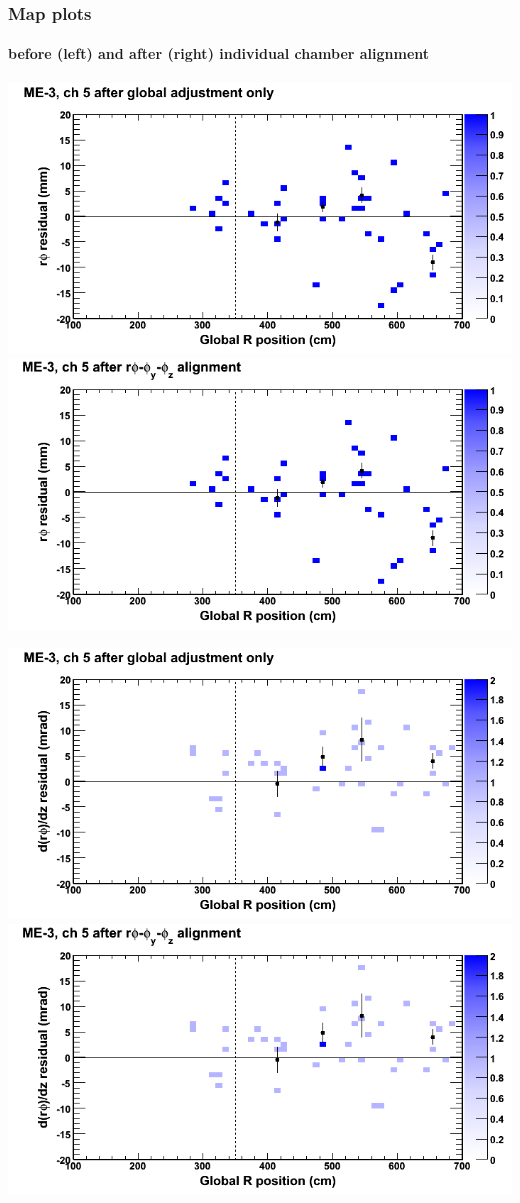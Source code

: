 \documentclass[compress]{beamer}
\begin{document}
\begin{frame}
\frametitle{Map plots}
\framesubtitle{before (left) and after (right) individual chamber alignment}
\includegraphics[width=0.5\linewidth]{ringmapplots_3dof/before_CSCvsr_mem3ch05_x.png} \includegraphics[width=0.5\linewidth]{ringmapplots_3dof/after_CSCvsr_mem3ch05_x.png}

\includegraphics[width=0.5\linewidth]{ringmapplots_3dof/before_CSCvsr_mem3ch05_dxdz.png} \includegraphics[width=0.5\linewidth]{ringmapplots_3dof/after_CSCvsr_mem3ch05_dxdz.png}
\end{frame}
\end{document}

